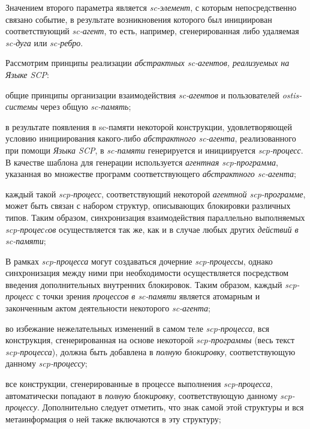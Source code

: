 Значением второго параметра является \textit{sc-элемент}, с которым непосредственно связано событие, в результате возникновения которого был инициирован соответствующий \textit{sc-агент}, то есть, например, сгенерированная либо удаляемая \textit{sc-дуга} или \textit{sc-ребро}.

Рассмотрим принципы реализации \textit{абстрактных sc-агентов, реализуемых на Языке SCP}:
\begin{textitemize}
\item общие принципы организации взаимодействия \textit{sc-агентов} и пользователей \textit{ostis-системы} через общую \textit{sc-память};
\item в результате появления в sc-памяти некоторой конструкции,
удовлетворяющей условию инициирования какого-либо \textit{абстрактного sc-агента}, реализованного при помощи \textit{Языка SCP}, в \textit{sc-памяти} генерируется и инициируется \textit{scp-процесс}. В качестве шаблона для генерации используется \textit{агентная scp-программа}, указанная во множестве программ соответствующего \textit{абстрактного sc-агента};
\item каждый такой \textit{scp-процесс}, соответствующий некоторой \textit{агентной scp-программе}, может быть связан с набором структур, описывающих блокировки различных типов. Таким образом, синхронизация взаимодействия параллельно выполняемых \textit{scp-процесcов} осуществляется так же, как и в случае любых других \textit{действий в sc-памяти};
\item В рамках \textit{scp-процесса} могут создаваться дочерние
\textit{scp-процессы}, однако синхронизация между ними при необходимости осуществляется посредством введения дополнительных внутренних блокировок. Таким образом, каждый \textit{scp-процесс} с точки зрения \textit{процессов в sc-памяти} является атомарным и законченным актом деятельности некоторого \textit{sc-агента};
\item во избежание нежелательных изменений в самом теле \textit{scp-процесса}, вся конструкция, сгенерированная на основе некоторой \textit{scp-программы} (весь текст \textit{scp-процесса}), должна быть добавлена в \textit{полную блокировку}, соответствующую данному \textit{scp-процессу};
\item все конструкции, сгенерированные в процессе выполнения
\textit{scp-процесса}, автоматически попадают в \textit{полную 	блокировку}, соответствующую данному \textit{scp-процессу}. Дополнительно следует отметить, что знак самой этой структуры и вся метаинформация о ней также включаются в эту структуру;

\end{textitemize}
